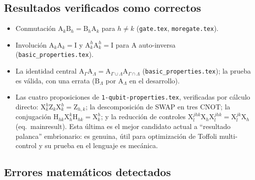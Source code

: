 \documentclass[12pt, a4paper]{article}
\newcommand{\gate}[1]{\text{#1}}
\newcommand{\stategate}[3]{\gate{#1}^{#2}_{#3}}
\begin{document}
\subsection{Resultados verificados como correctos}

\begin{itemize}
  \item Conmutación $\gate{A}_k\gate{B}_h = \gate{B}_h\gate{A}_k$ para
        $h \neq k$ (\texttt{gate.tex}, \texttt{moregate.tex}).
  \item Involución $\gate{A}_k\gate{A}_k=\gate{I}$ y
        $\stategate{A}{h}{k}\stategate{A}{h}{k}=\gate{I}$ para $\gate{A}$
        auto-inversa (\texttt{basic\_properties.tex}).
  \item La identidad central
        $\gate{A}_\Gamma\gate{A}_\Lambda =
          \gate{A}_{\Gamma\cup\Lambda}\gate{A}_{\Gamma\cap\Lambda}$
        (\texttt{basic\_properties.tex}); la prueba es válida, con una errata
        ($\gate{B}_\Lambda$ por $\gate{A}_\Lambda$ en el desarrollo).
  \item Las cuatro proposiciones de \texttt{1-qubit-properties.tex},
        verificadas por cálculo directo:
        $\stategate{X}{h}{k}\gate{Z}_k\stategate{X}{h}{k}=\gate{Z}_{h,k}$;
        la descomposición de SWAP en tres CNOT; la conjugación
        $\gate{H}_{hk}\stategate{X}{k}{h}\gate{H}_{hk}=\stategate{X}{h}{k}$;
        y la reducción de controles
        $\stategate{X}{jhk}{l}\gate{X}_h\stategate{X}{jhk}{l}
          =\stategate{X}{jk}{l}\gate{X}_h$ (eq.~mainresult). Esta última es el
        mejor candidato actual a ``resultado palanca'' embrionario: es
        genuina, útil para optimización de Toffoli multi-control y su prueba
        en el lenguaje es mecánica.
\end{itemize}

\subsection{Errores matemáticos detectados}
\end{document}

